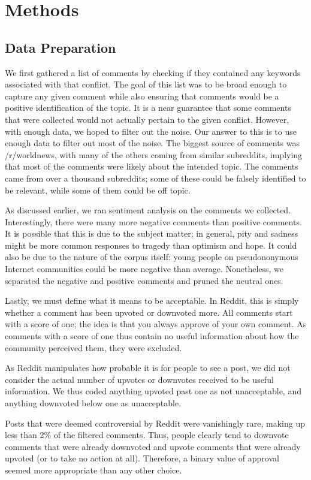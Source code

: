 \section{Methods}
\subsection{Data Preparation}
We first gathered a list of comments by checking if they contained any keywords associated with that conflict. The goal of this list was to be broad enough to capture any given comment while also ensuring that comments would be a positive identification of the topic. It is a near guarantee that some comments that were collected would not actually pertain to the given conflict. However, with enough data, we hoped to filter out the noise. Our answer to this is to use enough data to filter out most of the noise. The biggest source of comments was /r/worldnews, with many of the others coming from similar subreddits, implying that most of the comments were likely about the intended topic. The comments came from over a thousand subreddits; some of these could be falsely identified to be relevant, while some of them could be off topic. 

As discussed earlier, we ran sentiment analysis on the comments we collected. Interestingly, there were many more negative comments than positive comments. It is possible that this is due to the subject matter; in general, pity and sadness might be more common responses to tragedy than optimism and hope. It could also be due to the nature of the corpus itself: young people on pseudononymous Internet communities could be more negative than average. Nonetheless, we separated the negative and positive comments and pruned the neutral ones.

Lastly, we must define what it means to be acceptable. In Reddit, this is  simply whether a comment has been upvoted or downvoted more. All comments start with a score of one; the idea is that you always approve of your own comment. As comments with a score of one thus contain no useful information about how the community perceived them, they were excluded. 

As Reddit manipulates how probable it is for people to see a post, we did not consider the actual number of upvotes or downvotes received to be useful information. We thus coded anything upvoted past one as not unacceptable, and anything downvoted below one as unacceptable.

Posts that were deemed controversial by Reddit were vanishingly rare, making up less than 2\% of the filtered comments. Thus, people clearly tend to downvote comments that were already downvoted and upvote comments that were already upvoted (or to take no action at all). Therefore, a binary value of approval seemed more appropriate than any other choice.

